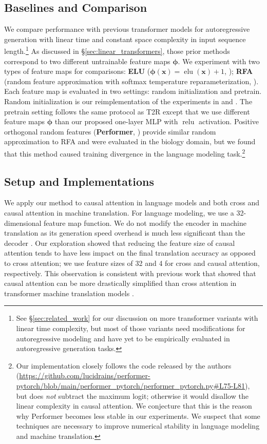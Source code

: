 \documentclass[11pt]{article}
\def\vphi{{\boldsymbol{\phi}}}
\def\vx{{\mathbf{x}}}
\newcommand{\relu}{{\operatorname{relu}}}
\newcommand{\elu}{{\operatorname{elu}}}
\newcommand{\TRNN}{T2R\xspace}
\begin{document}
\subsection{Baselines and Comparison}
We compare performance with previous transformer models for autoregressive generation with linear time and constant space complexity in input sequence length.\footnote{See \S\ref{sec:related_work} for our discussion on more transformer variants with linear time complexity, but most of those variants need modifications for autoregressive modeling and have yet to be empirically evaluated in autoregressive generation tasks.} 
As discussed in \S\ref{sec:linear_transformers}, those prior methods correspond to two different untrainable feature maps $\vphi$.
We experiment with two types of feature maps for comparisons: \textbf{ELU} ($\vphi\left(\vx\right) = \elu \left(\vx\right) + 1$, \citealp{katharopoulos-et-al-2020}); \textbf{RFA} (random feature approximation with softmax temperature reparameterization, \citealp{RFA}).
Each feature map is evaluated in two settings: random initialization and pretrain.
Random initialization is our reimplementation of the experiments in \citet{katharopoulos-et-al-2020} and \citet{RFA}.
The pretrain setting follows the same protocol as \TRNN except that we use different feature maps $\vphi$ than our proposed one-layer MLP with $\relu$ activation.
Positive orthogonal random features (\textbf{Performer}, \citealp{performer}) provide similar random approximation to RFA and were evaluated in the biology domain, but we found that this method caused training divergence in the language modeling task.\footnote{Our implementation closely follows the code released by the authors (\url{https://github.com/lucidrains/performer-pytorch/blob/main/performer_pytorch/performer_pytorch.py\#L75-L81}), but does \textit{not} subtract the maximum logit; otherwise it would disallow the linear complexity in causal attention. We conjecture that this is the reason why Performer becomes less stable in our experiments. We suspect that some techniques are necessary to improve numerical stability in language modeling and machine translation.
}


 


\subsection{Setup and Implementations}
We apply our method to causal attention in language models and both cross and causal attention in machine translation.
For language modeling, we use a 32-dimensional feature map function.
We do not modify the encoder in machine translation as its generation speed overhead is much less significant than the decoder \cite{deepshallow}.
Our exploration showed that reducing the feature size of causal attention tends to have less impact on the final translation accuracy as opposed to cross attention; we use feature sizes of 32 and 4 for cross and causal attention, respectively. 
This observation is consistent with previous work that showed that causal attention can be more drastically simplified than cross attention in transformer machine translation models \cite{you-etal-2020-hard, synthesizer}.
\end{document}
